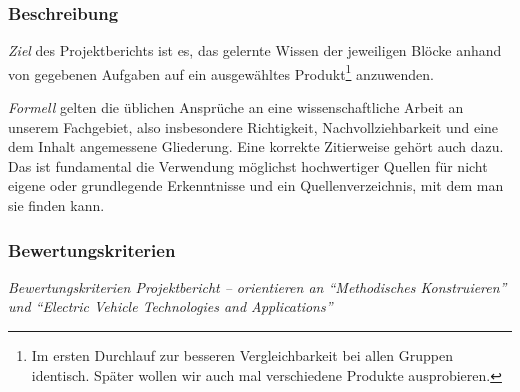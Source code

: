 \documentclass[DIV=15,headinclude=true]{scrartcl}
\begin{document}
\subsubsection{Beschreibung}

\emph{Ziel} des Projektberichts ist es, das gelernte Wissen der
jeweiligen Blöcke anhand von gegebenen Aufgaben auf ein ausgewähltes
Produkt\footnote{Im ersten Durchlauf zur besseren Vergleichbarkeit bei
	allen Gruppen identisch. Später wollen wir auch mal verschiedene
	Produkte ausprobieren.} anzuwenden.

\emph{Formell} gelten die üblichen Ansprüche an eine wissenschaftliche
Arbeit an unserem Fachgebiet, also insbesondere Richtigkeit,
Nachvollziehbarkeit und eine dem Inhalt angemessene Gliederung. Eine
korrekte Zitierweise gehört auch dazu. Das ist fundamental die
Verwendung möglichst hochwertiger Quellen für nicht eigene oder
grundlegende Erkenntnisse und ein Quellenverzeichnis, mit dem man sie
finden kann.

\subsubsection{Bewertungskriterien}

\begin{framed}

	\emph{Bewertungskriterien Projektbericht -- orientieren an
		\enquote{Methodisches Konstruieren} und \enquote{Electric Vehicle
			Technologies and Applications}}

\end{framed}

\end{document}
